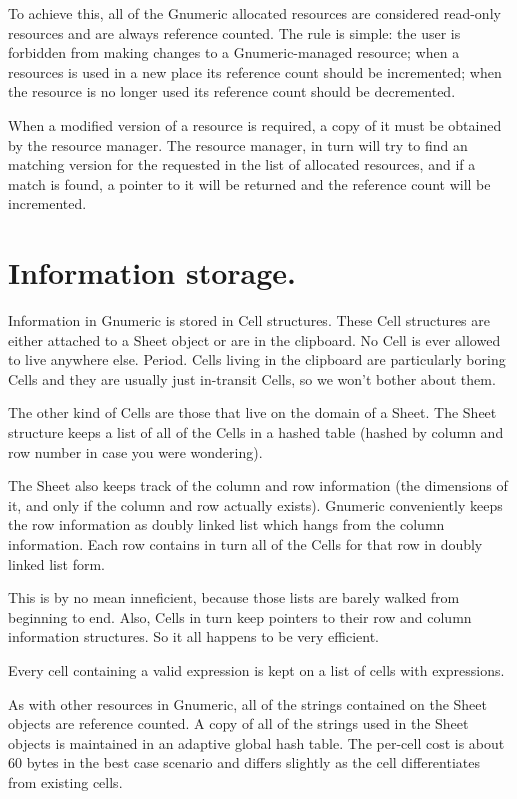 \documentclass[12pt,twoside,twocolumn]{article}
\begin{document}
To achieve this, all of the Gnumeric allocated resources are
considered read-only resources and are always reference counted.  The
rule is simple: the user is forbidden from making changes to a
Gnumeric-managed resource;  when a resources is used in a new place
its reference count should be incremented;  when the resource is no
longer used its reference count should be decremented. 

When a modified version of a resource is required, a copy of it must
be obtained by the resource manager.  The resource manager, in turn
will try to find an matching version for the requested in the list of
allocated resources, and if a match is found, a pointer to it will be
returned and the reference count will be incremented.


\section{Information storage.}

Information in Gnumeric is stored in Cell structures.  These Cell
structures are either attached to a Sheet object or are in the
clipboard.  No Cell is ever allowed to live anywhere else.  Period.
Cells living in the clipboard are particularly boring Cells and they
are usually just in-transit Cells, so we won't bother about them.

The other kind of Cells are those that live on the domain of a Sheet.
The Sheet structure keeps a list of all of the Cells in a hashed table
(hashed by column and row number in case you were wondering).  

The Sheet also keeps track of the column and row information (the
dimensions of it, and only if the column and row actually exists).
Gnumeric conveniently keeps the row information as doubly linked list
which hangs from the column information.  Each row contains in turn
all of the Cells for that row in doubly linked list form.

This is by no mean inneficient, because those lists are barely walked
from beginning to end.  Also, Cells in turn keep pointers to their
row and column information structures.  So it all happens to be very
efficient. 

Every cell containing a valid expression is kept on a list of
cells with expressions. 

As with other resources in Gnumeric, all of the strings contained on
the Sheet objects are reference counted.  A copy of all of the strings
used in the Sheet objects is maintained in an adaptive global hash
table.  The per-cell cost is about 60 bytes in the best case scenario
and differs slightly as the cell differentiates from existing cells.
\end{document}
